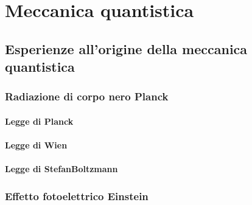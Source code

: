 \documentclass[letterpaper,10pt,italian]{jupyterBook}
\begin{document}
\sphinxstepscope


\chapter{Meccanica quantistica}
\label{\detokenize{ch/modern/quantum:meccanica-quantistica}}\label{\detokenize{ch/modern/quantum:physics-hs-modern-quantum}}\label{\detokenize{ch/modern/quantum::doc}}

\section{Esperienze all’origine della meccanica quantistica}
\label{\detokenize{ch/modern/quantum:esperienze-all-origine-della-meccanica-quantistica}}\label{\detokenize{ch/modern/quantum:physics-hs-modern-quantum-experience}}

\subsection{Radiazione di corpo nero \sphinxhyphen{} Planck}
\label{\detokenize{ch/modern/quantum:radiazione-di-corpo-nero-planck}}\label{\detokenize{ch/modern/quantum:physics-hs-modern-quantum-experience-black-body}}

\subsubsection{Legge di Planck}
\label{\detokenize{ch/modern/quantum:legge-di-planck}}\label{\detokenize{ch/modern/quantum:physics-hs-modern-quantum-experience-black-body-planck}}

\subsubsection{Legge di Wien}
\label{\detokenize{ch/modern/quantum:legge-di-wien}}\label{\detokenize{ch/modern/quantum:physics-hs-modern-quantum-experience-black-body-wien}}

\subsubsection{Legge di Stefan\sphinxhyphen{}Boltzmann}
\label{\detokenize{ch/modern/quantum:legge-di-stefan-boltzmann}}\label{\detokenize{ch/modern/quantum:physics-hs-modern-quantum-experience-black-body-stefan-boltzmann}}

\subsection{Effetto fotoelettrico \sphinxhyphen{} Einstein}
\label{\detokenize{ch/modern/quantum:effetto-fotoelettrico-einstein}}\label{\detokenize{ch/modern/quantum:physics-hs-modern-quantum-experience-pe-effect}}
\end{document}
